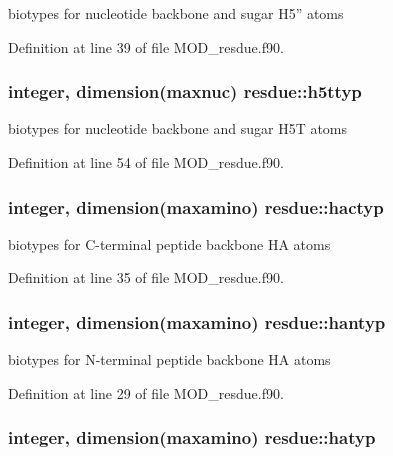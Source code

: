 biotypes for nucleotide backbone and sugar H5'' atoms 



Definition at line 39 of file M\-O\-D\-\_\-resdue.\-f90.

\hypertarget{classresdue_ada509c4f4faf38d11b7074364318f24f}{
\subsubsection[{h5ttyp}]{\setlength{\rightskip}{0pt plus 5cm}integer, dimension(maxnuc) resdue\-::h5ttyp}}\label{classresdue_ada509c4f4faf38d11b7074364318f24f}


biotypes for nucleotide backbone and sugar H5\-T atoms 



Definition at line 54 of file M\-O\-D\-\_\-resdue.\-f90.

\hypertarget{classresdue_ae87374ba5c19bd0b66fe871dbbdcc26e}{
\subsubsection[{hactyp}]{\setlength{\rightskip}{0pt plus 5cm}integer, dimension(maxamino) resdue\-::hactyp}}\label{classresdue_ae87374ba5c19bd0b66fe871dbbdcc26e}


biotypes for C-\/terminal peptide backbone H\-A atoms 



Definition at line 35 of file M\-O\-D\-\_\-resdue.\-f90.

\hypertarget{classresdue_a8b657c92c1c4475acb2dc5a11234653f}{
\subsubsection[{hantyp}]{\setlength{\rightskip}{0pt plus 5cm}integer, dimension(maxamino) resdue\-::hantyp}}\label{classresdue_a8b657c92c1c4475acb2dc5a11234653f}


biotypes for N-\/terminal peptide backbone H\-A atoms 



Definition at line 29 of file M\-O\-D\-\_\-resdue.\-f90.

\hypertarget{classresdue_a3d33a8ca66e1895d0e6bbe4d393613bb}{
\subsubsection[{hatyp}]{\setlength{\rightskip}{0pt plus 5cm}integer, dimension(maxamino) resdue\-::hatyp}}\label{classresdue_a3d33a8ca66e1895d0e6bbe4d393613bb}


